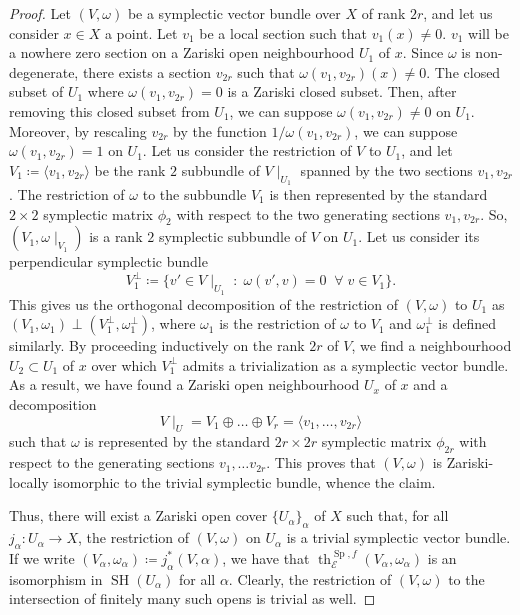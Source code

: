 \documentclass[10pt]{amsart}
\theoremstyle{definition}
\theoremstyle{plain}
\numberwithin{equation}{section}
\newcommand{\0}{\emptyset}
\newcommand{\sE}{{\mathcal E}}
\newcommand{\Sp}{{\operatorname{Sp}}}
\newcommand{\SH}{{\operatorname{SH}}}
\renewcommand{\th}{{\operatorname{th}}}
\begin{document}
\begin{proof}
Let $(V,\omega)$ be a symplectic vector bundle over $X$ of rank $2r$, and let us consider $x \in X$ a point. Let $v_1$ be a local section such that $v_1(x)\neq 0$. $v_1$ will be a nowhere zero section on a Zariski open neighbourhood $U_1$ of $x$. Since $\omega$ is non-degenerate, there exists a section $v_{2r}$ such that $\omega(v_1,v_{2r})(x)\neq 0$. The closed subset of $U_1$ where $\omega(v_1,v_{2r})=0$ is a Zariski closed subset. Then, after removing this closed subset from $U_1$, we can suppose $\omega(v_1,v_{2r}) \neq 0$ on $U_1$. Moreover, by rescaling $v_{2r}$ by the function $1/\omega(v_1,v_{2r})$, we can suppose $\omega(v_1,v_{2r})=1$ on $U_1$. Let us consider the restriction of $V$ to $U_1$, and let $V_1 \coloneqq \langle v_1, v_{2r} \rangle$ be the rank $2$ subbundle of $V\mid _{U_1}$ spanned by the two sections $v_1,v_{2r}$. The restriction of $\omega$ to the subbundle $V_1$ is then represented by the standard $2 \times 2$ symplectic matrix $\phi_2$ with respect to the two generating sections $v_1,v_{2r}$. So, $(V_1,\omega\mid_{V_1})$ is a rank $2$ symplectic subbundle of $V$ on $U_1$. Let us consider its perpendicular symplectic bundle
$$V_1 ^{\perp} \coloneqq \{v' \in V \mid_{U_1} \; : \; \omega(v',v)=0 \; \; \forall \; v \in V_1\}.$$
This gives us the orthogonal decomposition of the restriction of $(V,\omega)$ to $U_1$ as $(V_1,\omega_1)\perp(V_1^\perp,\omega_1^\perp)$, where $\omega_1$ is the restriction of $\omega$ to $V_1$ and $\omega_1^\perp$ is defined similarly. By proceeding inductively on the rank $2r$ of $V$, we find a neighbourhood $U_2 \subset U_1$ of $x$ over which $V_1^\perp$ admits a trivialization as a symplectic vector bundle. As a result, we have found a Zariski open neighbourhood $U_x$ of $x$ and a decomposition 
$$V \mid_U=V_1 \oplus \ldots \oplus V_r = \langle v_1, \ldots, v_{2r} \rangle$$
such that $\omega$ is represented by the standard $2r \times 2r$ symplectic matrix $\phi_{2r}$ with respect to the generating sections $v_1, \ldots v_{2r}$. This proves that $(V,\omega)$ is Zariski-locally isomorphic to the trivial symplectic bundle, whence the claim.

Thus, there will exist a Zariski open cover $\{U_{\alpha}\}_{\alpha}$ of $X$ such that, for all $j_{\alpha}:U_{\alpha}\to X$, the restriction of $(V,\omega)$ on $U_{\alpha}$ is a trivial symplectic vector bundle. If we write $(V_{\alpha},\omega_{\alpha}) \coloneqq j_{\alpha}^*(V,\alpha)$, we have that $\th_{\sE}^{\Sp,f}(V_\alpha,\omega_\alpha)$ is an isomorphism in $\SH(U_{\alpha})$ for all $\alpha$. Clearly, the restriction of $(V,\omega)$ to the intersection of finitely many such opens is trivial as well.


\end{proof}
\end{document}
